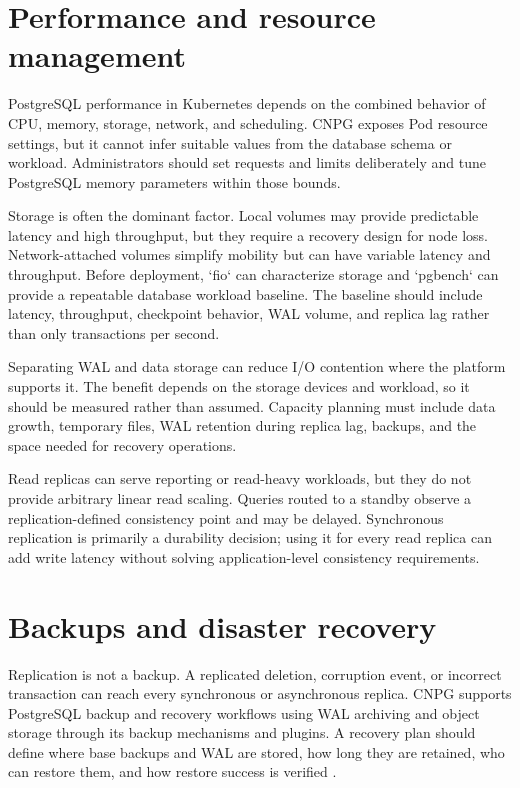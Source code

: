 \documentclass[11pt,a4paper]{article}
\begin{document}
\section{Performance and resource management}

PostgreSQL performance in Kubernetes depends on the combined behavior of CPU, memory, storage, network, and scheduling. CNPG exposes Pod resource settings, but it cannot infer suitable values from the database schema or workload. Administrators should set requests and limits deliberately and tune PostgreSQL memory parameters within those bounds.

Storage is often the dominant factor. Local volumes may provide predictable latency and high throughput, but they require a recovery design for node loss. Network-attached volumes simplify mobility but can have variable latency and throughput. Before deployment, `fio` can characterize storage and `pgbench` can provide a repeatable database workload baseline. The baseline should include latency, throughput, checkpoint behavior, WAL volume, and replica lag rather than only transactions per second.

Separating WAL and data storage can reduce I/O contention where the platform supports it. The benefit depends on the storage devices and workload, so it should be measured rather than assumed. Capacity planning must include data growth, temporary files, WAL retention during replica lag, backups, and the space needed for recovery operations.

Read replicas can serve reporting or read-heavy workloads, but they do not provide arbitrary linear read scaling. Queries routed to a standby observe a replication-defined consistency point and may be delayed. Synchronous replication is primarily a durability decision; using it for every read replica can add write latency without solving application-level consistency requirements.

\section{Backups and disaster recovery}

Replication is not a backup. A replicated deletion, corruption event, or incorrect transaction can reach every synchronous or asynchronous replica. CNPG supports PostgreSQL backup and recovery workflows using WAL archiving and object storage through its backup mechanisms and plugins. A recovery plan should define where base backups and WAL are stored, how long they are retained, who can restore them, and how restore success is verified \cite{cnpg-backups,cnpg-barman}.
\end{document}
